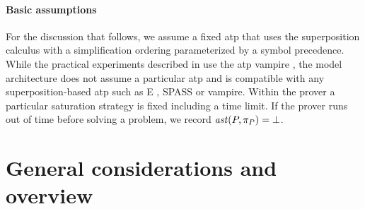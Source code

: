 \documentclass[a4paper]{easychair}
\begin{document}

\paragraph{Basic assumptions}

For the discussion that follows,
we assume a fixed %
\gls*{atp} that uses the superposition calculus with a simplification ordering parameterized by a symbol precedence.
While the practical experiments described in  use the \gls*{atp} \gls*{vampire} \cite{Kovacs2013},
the model architecture does not assume a particular \gls*{atp}
and is compatible with any superposition-based \gls*{atp} such as E \cite{SCV:CADE-2019}, SPASS \cite{DBLP:conf/cade/WeidenbachDFKSW09} or  \gls*{vampire}.
% 
Within the prover a particular saturation strategy is fixed including a time limit.
If the prover runs out of time before solving a problem, we record \(\operatorname{\mathit{ast}}(P,\pi_P) = \bot\).




\section{General considerations and overview} \label{sect:overview}
\end{document}
